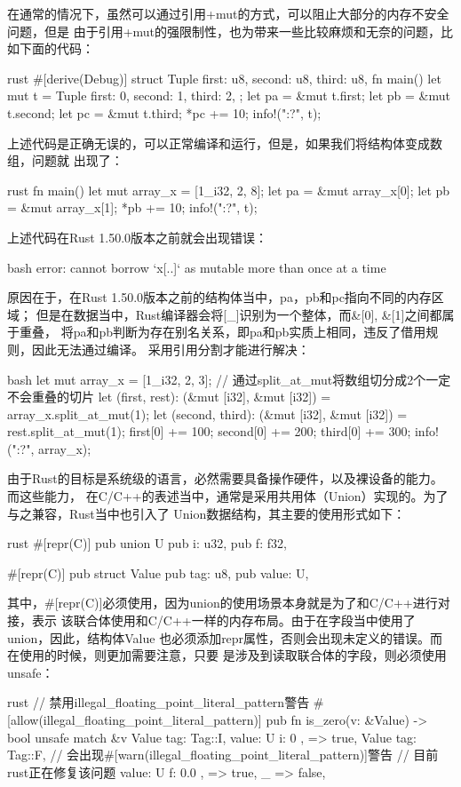 在通常的情况下，虽然可以通过引用+mut的方式，可以阻止大部分的内存不安全问题，但是
由于引用+mut的强限制性，也为带来一些比较麻烦和无奈的问题，比如下面的代码：
\begin{code-block}{rust}
#[derive(Debug)]
struct Tuple {
    first: u8,
    second: u8,
    third: u8,
}
fn main() {
    let mut t = Tuple {
        first: 0,
        second: 1,
        third: 2,
    };
    let pa = &mut t.first;
    let pb = &mut t.second;
    let pc = &mut t.third;
    *pc += 10;
    info!("{:?}", t);
}
\end{code-block}
上述代码是正确无误的，可以正常编译和运行，但是，如果我们将结构体变成数组，问题就
出现了：
\begin{code-block}{rust}
fn main() {
    let mut array_x = [1_i32, 2, 8];
    let pa = &mut array_x[0];
    let pb = &mut array_x[1];
    *pb += 10;
    info!("{:?}", t);
}
\end{code-block}
上述代码在Rust 1.50.0版本之前就会出现错误：
\begin{code-block}{bash}
error: cannot borrow `x[..]` as mutable more than once at a time
\end{code-block}
原因在于，在Rust 1.50.0版本之前的结构体当中，pa，pb和pc指向不同的内存区域；
但是在数据当中，Rust编译器会将[\_]识别为一个整体，而\&[0], \&[1]之间都属于重叠，
将pa和pb判断为存在别名关系，即pa和pb实质上相同，违反了借用规则，因此无法通过编译。
采用引用分割才能进行解决：
\begin{code-block}{bash}
let mut array_x = [1_i32, 2, 3];
// 通过split_at_mut将数组切分成2个一定不会重叠的切片
let (first, rest): (&mut [i32], &mut [i32]) = array_x.split_at_mut(1);
let (second, third): (&mut [i32], &mut [i32]) = rest.split_at_mut(1);
first[0] += 100;
second[0] += 200;
third[0] += 300;
info!("{:?}", array_x);
\end{code-block}

由于Rust的目标是系统级的语言，必然需要具备操作硬件，以及裸设备的能力。而这些能力，
在C/C++的表述当中，通常是采用共用体（Union）实现的。为了与之兼容，Rust当中也引入了
Union数据结构，其主要的使用形式如下：
\begin{code-block}{rust}
#[repr(C)]
pub union U {
    pub i: u32,
    pub f: f32,
}

#[repr(C)]
pub struct Value {
    pub tag: u8,
    pub value: U,
}
\end{code-block}
其中，\#[repr(C)]必须使用，因为union的使用场景本身就是为了和C/C++进行对接，表示
该联合体使用和C/C++一样的内存布局。由于在字段当中使用了union，因此，结构体Value
也必须添加repr属性，否则会出现未定义的错误。而在使用的时候，则更加需要注意，只要
是涉及到读取联合体的字段，则必须使用unsafe：
\begin{code-block}{rust}
// 禁用illegal_floating_point_literal_pattern警告
#[allow(illegal_floating_point_literal_pattern)]
pub fn is_zero(v: &Value) -> bool {
    unsafe {
        match &v {
            Value {
                tag: Tag::I,
                value: U { i: 0 },
            } => true,
            Value {
                tag: Tag::F,
                // 会出现#[warn(illegal_floating_point_literal_pattern)]警告
                // 目前rust正在修复该问题
                value: U { f: 0.0 },
            } => true,
            _ => false,
        }
    }
}
\end{code-block}

